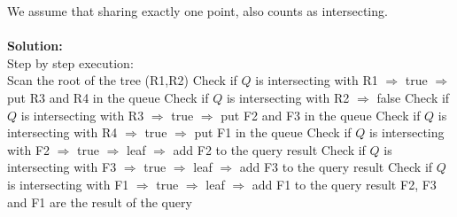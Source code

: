 \begin{enumerate}
  We assume that sharing exactly one point, also counts as intersecting.\\\\
  {\bf Solution:}\\
Step by step execution:\\
  \subitem
  Scan the root of the tree (R1,R2)
  \subitem
  Check if $Q$ is intersecting with R1 $\Rightarrow$ true $\Rightarrow$ put R3 and R4 in the queue
  \subitem
  Check if $Q$ is intersecting with R2 $\Rightarrow$ false
  \subitem
  Check if $Q$ is intersecting with R3 $\Rightarrow$ true $\Rightarrow$ put F2 and F3 in the queue
  \subitem
  Check if $Q$ is intersecting with R4 $\Rightarrow$ true $\Rightarrow$ put F1 in the queue
  \subitem
  Check if $Q$ is intersecting with F2 $\Rightarrow$ true $\Rightarrow$ leaf $\Rightarrow$ add F2 to the query result
  \subitem
  Check if $Q$ is intersecting with F3 $\Rightarrow$ true $\Rightarrow$ leaf $\Rightarrow$ add F3 to the query result
  \subitem
  Check if $Q$ is intersecting with F1 $\Rightarrow$ true $\Rightarrow$ leaf $\Rightarrow$ add F1 to the query result
  {\subitem
  F2, F3 and F1 are the result of the query}

\end{enumerate}


